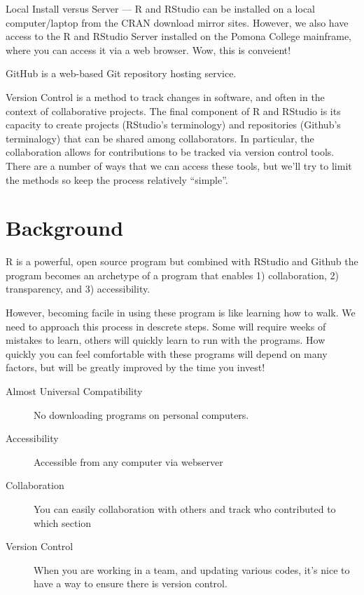 \documentclass[12pt]{../SOP3_beta}
\begin{document}
\NP Local Install versus Server --- R and RStudio can be installed on a local computer/laptop from the CRAN download mirror sites. However, we also have access to the R and RStudio Server installed on the Pomona College mainframe, where you can access it via a web browser. Wow, this is conveient!

\NP GitHub is a web-based Git repository hosting service. 

\NP Version Control is a method to track changes in software, and often in the context of collaborative projects. The final component of R and RStudio is its capacity to create projects (RStudio's terminology) and repositories (Github's terminalogy) that can be shared among collaborators. In particular, the collaboration allows for contributions to be tracked via version control tools. There are a number of ways that we can access these tools, but we'll try to limit the methods so keep the process relatively ``simple''.


\section{Background}

\NP R is a powerful, open source program but combined with RStudio and Github the program becomes an archetype of a program that enables 1) collaboration, 2) transparency, and 3) accessibility.

\NP However, becoming facile in using these program is like learning how to walk. We need to approach this process in descrete steps. Some will require weeks of mistakes to learn, others will quickly learn to run with the programs. How quickly you can feel comfortable with these programs will depend on many factors, but will be greatly improved by the time you invest!

\begin{description}
  \item[Almost Universal Compatibility] No downloading programs on personal computers.
  \item[Accessibility] Accessible from any computer via webserver
  \item[Collaboration] You can easily collaboration with others and track who contributed to which section
  \item[Version Control] When you are working in a team, and updating various codes, it's nice to have a way to ensure there is version control. 
\end{description}
\end{document}
